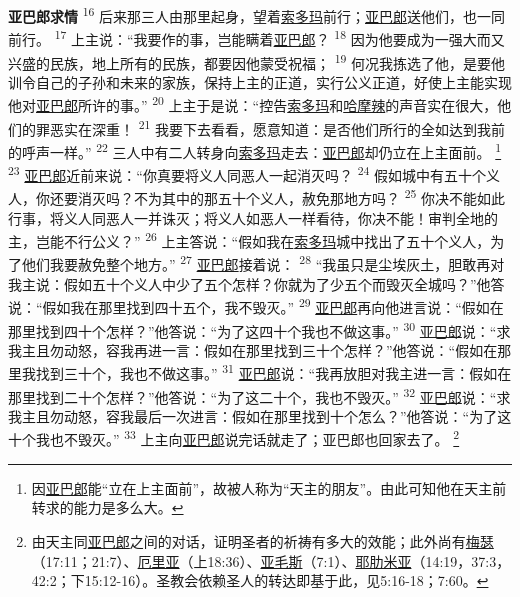 \textbf{亚巴郎求情 }
\textsuperscript{16}
后来那三人由那里起身，望着\uline{索多玛}前行；\uline{亚巴郎}送他们，也一同前行。
\textsuperscript{17}
上主说：“我要作的事，岂能瞒着\uline{亚巴郎}？
\textsuperscript{18}
因为他要成为一强大而又兴盛的民族，地上所有的民族，都要因他蒙受祝福；
\textsuperscript{19}
何况我拣选了他，是要他训令自己的子孙和未来的家族，保持上主的正道，实行公义正道，好使上主能实现他对\uline{亚巴郎}所许的事。”
\textsuperscript{20}
上主于是说：“控告\uline{索多玛}和\uline{哈摩辣}的声音实在很大，他们的罪恶实在深重！
\textsuperscript{21}
我要下去看看，愿意知道：是否他们所行的全如达到我前的呼声一样。”
\textsuperscript{22}
三人中有二人转身向\uline{索多玛}走去：\uline{亚巴郎}却仍立在上主面前。
\footnote{因\uline{亚巴郎}能“立在上主面前”，故被人称为“天主的朋友”。由此可知他在天主前转求的能力是多么大。}
\textsuperscript{23}
\uline{亚巴郎}近前来说：“你真要将义人同恶人一起消灭吗？
\textsuperscript{24}
假如城中有五十个义人，你还要消灭吗？不为其中的那五十个义人，赦免那地方吗？
\textsuperscript{25}
你决不能如此行事，将义人同恶人一并诛灭；将义人如恶人一样看待，你决不能！审判全地的主，岂能不行公义？”
\textsuperscript{26}
上主答说：“假如我在\uline{索多玛}城中找出了五十个义人，为了他们我要赦免整个地方。”
\textsuperscript{27}
\uline{亚巴郎}接着说：
\textsuperscript{28}
“我虽只是尘埃灰土，胆敢再对我主说：假如五十个义人中少了五个怎样？你就为了少五个而毁灭全城吗？”他答说：“假如我在那里找到四十五个，我不毁灭。”
\textsuperscript{29}
\uline{亚巴郎}再向他进言说：“假如在那里找到四十个怎样？”他答说：“为了这四十个我也不做这事。”
\textsuperscript{30}
\uline{亚巴郎}说：“求我主且勿动怒，容我再进一言：假如在那里找到三十个怎样？”他答说：“假如在那里我找到三十个，我也不做这事。”
\textsuperscript{31}
\uline{亚巴郎}说：“我再放胆对我主进一言：假如在那里找到二十个怎样？”他答说：“为了这二十个，我也不毁灭。”
\textsuperscript{32}
\uline{亚巴郎}说：“求我主且勿动怒，容我最后一次进言：假如在那里找到十个怎么？”他答说：“为了这十个我也不毁灭。”
\textsuperscript{33}
上主向\uline{亚巴郎}说完话就走了；亚巴郎也回家去了。
\footnote{由天主同\uline{亚巴郎}之间的对话，证明圣者的祈祷有多大的效能；此外尚有\uline{梅瑟}（17:11；21:7）、\uline{厄里亚}（上18:36）、\uline{亚毛斯}（7:1）、\uline{耶肋米亚}（14:19，37:3，42:2；下15:12-16）。圣教会依赖圣人的转达即基于此，见5:16-18；7:60。}

